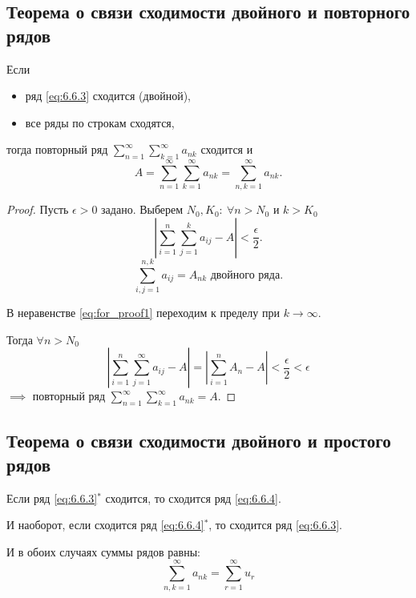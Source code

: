 \subsection{Теорема о связи сходимости двойного и повторного рядов}

\begin{theorem}
    Если
    \begin{itemize}
        \item ряд \ref{eq:6.6.3} сходится (двойной),
        \item все ряды по строкам сходятся,
    \end{itemize}
    тогда повторный ряд $ \sum_{n=1}^{\infty}\sum_{k=1}^{\infty}a_{nk} $ сходится и
    \[
        A = \sum_{n=1}^{\infty}\sum_{k=1}^{\infty}a_{nk} = \sum_{n,k=1}^{\infty}a_{nk}.
    \]
\end{theorem}

\begin{proof}
    Пусть $ \epsilon>0 $ задано. Выберем $ N_0,K_0: \ \forall n > N_0 $ и $ k>K_0 $
    \begin{equation}\label{eq:for_proof1}
        \left|\sum_{i=1}^{n}\sum_{j=1}^{k}a_{ij} - A\right| < \frac{\epsilon}{2}.
    \end{equation}
    \[
        \sum_{i,j=1}^{n,k}a_{ij} = A_{nk}\text{ двойного ряда}.
    \]

    В неравенстве \ref{eq:for_proof1} переходим к пределу при $ k \rightarrow\infty $.

    Тогда $ \forall n > N_0 $
    \[
        \left|\sum_{i=1}^{n}\sum_{j=1}^{\infty}a_{ij} - A\right| = \left|\sum_{i=1}^{n}A_n - A\right| < \frac{\epsilon}{2} < \epsilon
    \]
    $ \implies $ повторный ряд $ \sum_{n=1}^{\infty}\sum_{k=1}^{\infty}a_{nk} = A $.
\end{proof}

\subsection{Теорема о связи сходимости двойного и простого рядов}

\begin{theorem}
    Если ряд \ref{eq:6.6.3}$ ^* $ сходится, то сходится ряд \ref{eq:6.6.4}.

    И наоборот, если сходится ряд \ref{eq:6.6.4}$ ^* $, то сходится ряд \ref{eq:6.6.3}.

    И в обоих случаях суммы рядов равны:
    \[
        \sum_{n,k=1}^{\infty}a_{nk} = \sum_{r=1}^{\infty}u_r
    \]
\end{theorem}

